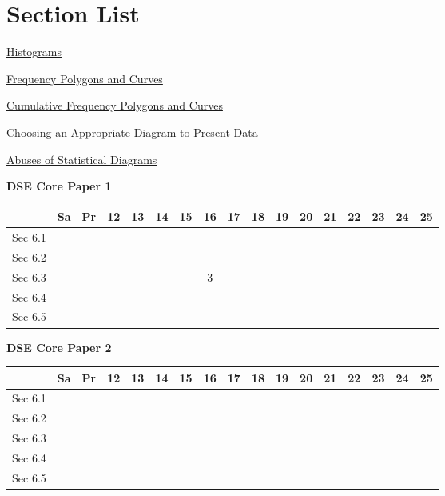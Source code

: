 \documentclass[12pt, a4paper]{article}
\begin{document}
\section*{Section List}
\begin{enumx}[label=Sec 6.\arabic*\ ]
\item \hyperref[section:2-6-1]{Histograms}
\item \hyperref[section:2-6-2]{Frequency Polygons and Curves}
\item \hyperref[section:2-6-3]{Cumulative Frequency Polygons and Curves}
\item \hyperref[section:2-6-4]{Choosing an Appropriate Diagram to Present Data}
\item \hyperref[section:2-6-5]{Abuses of Statistical Diagrams}
\end{enumx}
\begin{absolutelynopagebreak}
\begin{center}
\textbf{DSE Core Paper 1}
\end{center}
\begin{center}
\begin{tabular}{|l|c|c|c|c|c|c|c|c|c|c|c|c|c|c|c|c|}
\hline
        & Sa & Pr & 12 & 13 & 14 & 15 & 16 & 17 & 18 & 19 & 20 & 21 & 22 & 23 & 24 & 25 \\\hline\hline
Sec 6.1 &  &  &  &  &  &  &  &  &  &  &  &  &  &  &  &  \\\hline
Sec 6.2 &  &  &  &  &  &  &  &  &  &  &  &  &  &  &  &  \\\hline
Sec 6.3 &  &  &  &  &  &  &  $3$ &  &  &  &  &  &  &  &  &  \\\hline
Sec 6.4 &  &  &  &  &  &  &  &  &  &  &  &  &  &  &  &  \\\hline
Sec 6.5 &  &  &  &  &  &  &  &  &  &  &  &  &  &  &  &  \\\hline
\end{tabular}
\end{center}
\end{absolutelynopagebreak}
\begin{absolutelynopagebreak}
\begin{center}
\textbf{DSE Core Paper 2}
\end{center}
\begin{center}
\begin{tabular}{|l|c|c|c|c|c|c|c|c|c|c|c|c|c|c|c|c|}
\hline
        & Sa & Pr & 12 & 13 & 14 & 15 & 16 & 17 & 18 & 19 & 20 & 21 & 22 & 23 & 24 & 25 \\\hline\hline
Sec 6.1 &  &  &  &  &  &  &  &  &  &  &  &  &  &  &  &  \\\hline
Sec 6.2 &  &  &  &  &  &  &  &  &  &  &  &  &  &  &  &  \\\hline
Sec 6.3 &  &  &  &  &  &  &  &  &  &  &  &  &  &  &  &  \\\hline
Sec 6.4 &  &  &  &  &  &  &  &  &  &  &  &  &  &  &  &  \\\hline
Sec 6.5 &  &  &  &  &  &  &  &  &  &  &  &  &  &  &  &  \\\hline
\end{tabular}
\end{center}
\end{absolutelynopagebreak}
\end{document}

